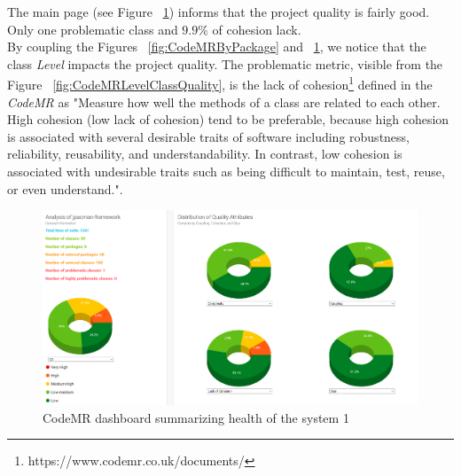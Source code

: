 \documentclass{article}
\begin{document}
The main page (see Figure ~\ref{fig:CodeMRDashboard}) informs that the project quality is fairly good. Only one problematic class and $9.9\%$ of cohesion lack. \\

By coupling the Figures ~\ref{fig:CodeMRByPackage} and ~\ref{fig:CodeMRDashboard}, we notice that the class \textit{Level} impacts the project quality. The problematic metric, visible from the Figure ~\ref{fig:CodeMRLevelClassQuality}, is the lack of cohesion\footnote{https://www.codemr.co.uk/documents/} defined in the \textit{CodeMR} as "Measure how well the methods of a class are related to each other. High cohesion (low lack of cohesion) tend to be preferable, because high cohesion is associated with several desirable traits of software including robustness, reliability, reusability, and understandability. In contrast, low cohesion is associated with undesirable traits such as being difficult to maintain, test, reuse, or even understand.".

\begin{figure}
    \centering
    \includegraphics[width=\linewidth]{imgs/CodeMRDashboard.PNG}
    \caption{CodeMR dashboard summarizing health of the system 1}
    \label{fig:CodeMRDashboard}
\end{figure}
\end{document}
